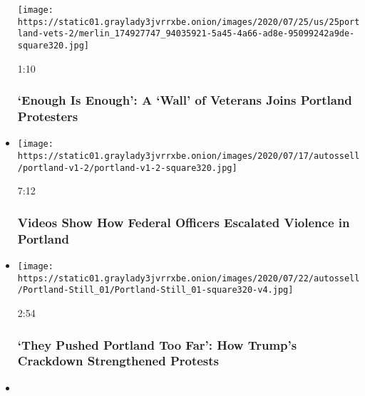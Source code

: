 \begin{itemize}
  \texttt{[image: https://static01.graylady3jvrrxbe.onion/images/2020/07/25/us/25portland-vets-2/merlin\_174927747\_94035921-5a45-4a66-ad8e-95099242a9de-square320.jpg]}

  1:10

  \hypertarget{enough-is-enough-a-wall-of-veterans-joins-portland-protesters}{%
  \subsubsection{`Enough Is Enough': A `Wall' of Veterans Joins Portland
  Protesters}\label{enough-is-enough-a-wall-of-veterans-joins-portland-protesters}}
\item
  \href{https://www.nytimes3xbfgragh.onion/video/us/100000007243995/portland-protests-federal-government.html?action=click\&module=video-series-bar\&region=header\&pgtype=Article\&playlistId=video/minneapolis-george-floyd-death-video}{}

  \texttt{[image: https://static01.graylady3jvrrxbe.onion/images/2020/07/17/autossell/portland-v1-2/portland-v1-2-square320.jpg]}

  7:12

  \hypertarget{videos-show-how-federal-officers-escalated-violence-in-portland}{%
  \subsubsection{Videos Show How Federal Officers Escalated Violence in
  Portland}\label{videos-show-how-federal-officers-escalated-violence-in-portland}}
\item
  \href{https://www.nytimes3xbfgragh.onion/video/us/100000007250985/they-pushed-portland-too-far-trump-crackdown-strengthens-protests.html?action=click\&module=video-series-bar\&region=header\&pgtype=Article\&playlistId=video/minneapolis-george-floyd-death-video}{}

  \texttt{[image: https://static01.graylady3jvrrxbe.onion/images/2020/07/22/autossell/Portland-Still\_01/Portland-Still\_01-square320-v4.jpg]}

  2:54

  \hypertarget{they-pushed-portland-too-far-how-trumps-crackdown-strengthened-protests}{%
  \subsubsection{`They Pushed Portland Too Far': How Trump's Crackdown
  Strengthened
  Protests}\label{they-pushed-portland-too-far-how-trumps-crackdown-strengthened-protests}}
\item
  \href{https://www.nytimes3xbfgragh.onion/video/us/politics/100000007251035/portland-unrest-protests.html?action=click\&module=video-series-bar\&region=header\&pgtype=Article\&playlistId=video/minneapolis-george-floyd-death-video}{}


\end{itemize}
